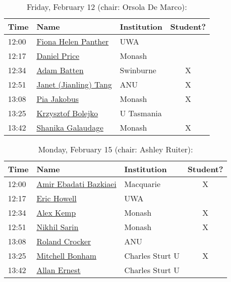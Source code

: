 \documentclass[amsmath,onecolumn]{revtex4-1}
\begin{document}
\begin{table}[!htbp]
	\centering
	\caption{Friday, February 12 (chair: Orsola De Marco):}
\begin{tabular}{| l | l | l | c |}
	\hline
	Time & Name  & Institution & Student? \\ 		
	\hline
	12:00 & \href{https://forms.gle/bZz2KNKeq9Sgx4bN7}{Fiona Helen Panther}  & UWA &  \\
	12:17 & \href{https://forms.gle/SeXaaVuk5Kjkj2Gp8}{Daniel Price} & Monash & \\
	12:34 & \href{https://forms.gle/CvUMW6DxeHCoNUYDA}{Adam Batten} & Swinburne & X \\
	12:51 & \href{https://forms.gle/CB2tycKLop6j5qnX8}{Janet (Jianling) Tang} & ANU & X \\
	13:08 & \href{https://forms.gle/7ZNMYiRSej84rja79}{Pia Jakobus} & Monash & X \\
	13:25 & \href{https://forms.gle/2K3YNcxBfqEpitnNA}{Krzysztof Bolejko} & U Tasmania  &	\\
	13:42 & \href{https://forms.gle/fSuaVDvJ5TiVxrKy9}{Shanika Galaudage} & Monash & X\\
	\hline
\end{tabular}
\end{table}

\begin{table}[!htbp]
	\centering
	\caption{Monday, February 15 (chair: Ashley Ruiter):}
\begin{tabular}{| l | l | l | c |}
	\hline
	Time & Name  & Institution & Student? \\ 		
	\hline
	12:00 & \href{https://forms.gle/mUYC1TzhTpjK5qSx6}{Amir Ebadati Bazkiaei} & Macquarie & X \\
	12:17 & \href{https://forms.gle/ykB4nvyVz4LPjCS5A}{Eric Howell} & UWA &\\
	12:34 & \href{https://forms.gle/pBPLKKWqjogAG22w6}{Alex Kemp} &  Monash & X\\
	12:51 & \href{https://forms.gle/6fpxyrUcNT8eADZY7}{Nikhil	Sarin} & Monash & X   \\
	13:08 & \href{https://forms.gle/14RQCWHA9Essh6ZK9}{Roland Crocker} & ANU & \\
	13:25 & \href{https://forms.gle/tLjJa6MEMgfoqBLb9}{Mitchell Bonham} & Charles Sturt U  & X\\
	13:42 & \href{https://forms.gle/cypNduJW9ZtThT2N7}{Allan Ernest} & Charles Sturt U & \\
	\hline
\end{tabular}
\end{table}
\end{document}
